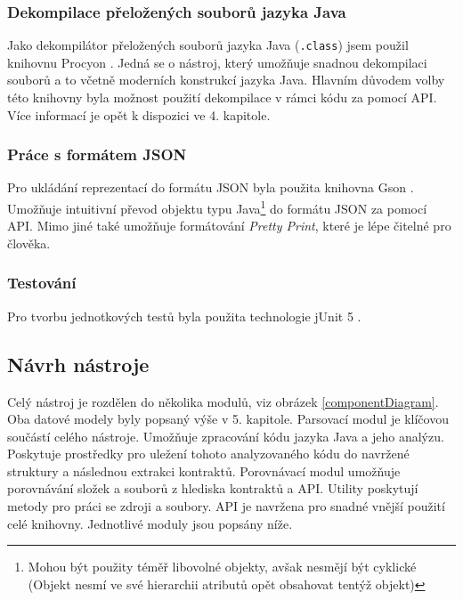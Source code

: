			\subsubsection{Dekompilace přeložených souborů jazyka Java}
				Jako dekompilátor přeložených souborů jazyka Java (\texttt{.class}) jsem použil knihovnu Procyon \cite{procyon}. Jedná se o nástroj, který umožňuje snadnou dekompilaci souborů a to včetně moderních konstrukcí jazyka Java. Hlavním důvodem volby této knihovny byla možnost použití dekompilace v rámci kódu za pomocí API. Více informací je opět k dispozici ve 4. kapitole.
				
			\subsubsection{Práce s formátem JSON}
				Pro ukládání reprezentací do formátu JSON byla použita knihovna Gson \cite{gson}. Umožňuje intuitivní převod objektu typu Java\footnote{Mohou být použity téměř libovolné objekty, avšak nesmějí být cyklické (Objekt nesmí ve své hierarchii atributů opět obsahovat tentýž objekt)} do formátu JSON za pomocí API. Mimo jiné také umožňuje formátování \emph{Pretty Print}, které je lépe čitelné pro člověka.
				
			\subsubsection{Testování}
				Pro tvorbu jednotkových testů byla použita technologie jUnit 5 \cite{junit}.   	 



		\subsection{Návrh nástroje}
			Celý nástroj je rozdělen do několika modulů, viz obrázek \ref{componentDiagram}. Oba datové modely byly popsaný výše v 5. kapitole. Parsovací modul je klíčovou součástí celého nástroje. Umožňuje zpracování kódu jazyka Java a jeho analýzu. Poskytuje prostředky pro uležení tohoto analyzovaného kódu do navržené struktury a následnou extrakci kontraktů. Porovnávací modul umožňuje porovnávání složek a souborů z hlediska kontraktů a API. Utility poskytují metody pro práci se zdroji a soubory. API je navržena pro snadné vnější použití celé knihovny. Jednotlivé moduly jsou popsány níže.		
		
